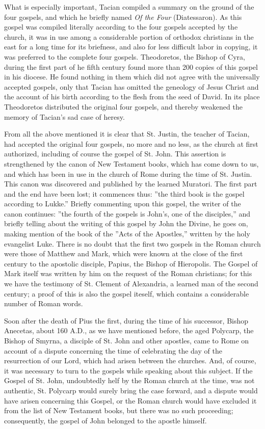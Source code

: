 What is especially important, Tacian compiled a summary on the ground of the four gospels, and which he briefly named \textit{Of the Four} (Diatessaron). As this gospel was compiled literally according to the four gospels accepted by the church, it was in use among a considerable portion of orthodox christians in the east for a long time for its briefness, and also for less difficult labor in copying, it was preferred to the complete four gospels. Theodoretos, the Bishop of Cyra, during the first part of he fifth century found more than 200 copies of this gospel in his diocese. He found nothing in them which did not agree with the universally accepted gospels, only that Tacian has omitted the geneology of Jesus Christ and the account of his birth according to the flesh from the seed of David. In its place Theodoretos distributed the original four gospels, and thereby weakened the memory of Tacian's sad case of heresy.

From all the above mentioned it is clear that St. Justin, the teacher of Tacian, had accepted the original four gospels, no more and no less, as the church at first authorized, including of course the gospel of St. John. This assertion is strengthened by the canon of New Testament books, which has come down to us, and which has been in use in the church of Rome during the time of St. Justin. This canon was discovered and published by the learned Muratori. The first part and the end have been lost; it commences thus: ''the third book is the gospel according to Lukke.'' Briefly commenting upon this gospel, the writer of the canon continues: ''the fourth of the gospels is John's, one of the disciples,'' and briefly telling about the writing of this gospel by John the Divine, he goes on, making mention of the book of the ''Acts of the Apostles,'' written by the holy evangelist Luke. There is no doubt that the first two gospels in the Roman church were those of Matthew and Mark, which were known at the close of the first century to the apostolic disciple, Papius, the Bishop of Hieropolis. The Gospel of Mark itself was written by him on the request of the Roman christians; for this we have the testimony of St. Clement of Alexandria, a learned man of the second century; a proof of this is also the gospel iteself, which contains a considerable number of Roman words.

Soon after the death of Pius the first, during the time of his successor, Bishop Anecetas, about 160 A.D., as we have mentioned before, the aged Polycarp, the Bishop of Smyrna, a disciple of St. John and other apostles, came to Rome on account of a dispute concerning the time of celebrating the day of the resurrection of our Lord, which had arisen between the churches. And, of course, it was necessary to turn to the gospels while speaking about this subject. If the Gospel of St. John, undoubtedly helf by the Roman church at the time, was not authentic, St. Polycarp would surely bring the case forward, and a dispute would have arisen concerning this Gospel, or the Roman church would have excluded it from the list of New Testament books, but there was no such proceeding; consequently, the gospel of John belonged to the apostle himself.

